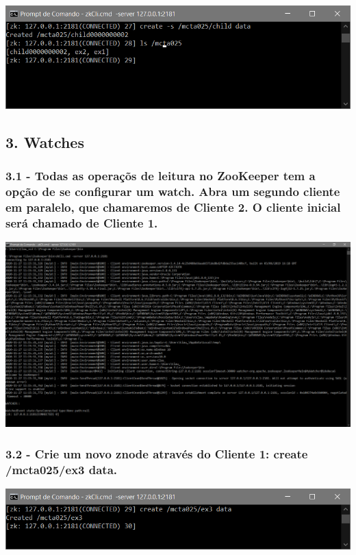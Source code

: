 \includegraphics{pratica3/prints/roteiro 2.7.PNG}


\subsection*{3. Watches}

\subsubsection{3.1 - Todas as operaçõs de leitura no ZooKeeper tem a opção de se
configurar um watch. Abra um segundo cliente em paralelo, que
chamaremos de Cliente 2. O cliente inicial será chamado de Cliente 1.}

\includegraphics[width=20cm]{pratica3/prints/client2_started.PNG}

\subsubsection{3.2 - Crie um novo znode através do Cliente 1: create /mcta025/ex3
data.}

\includegraphics{pratica3/prints/roteiro 3.2.PNG}

